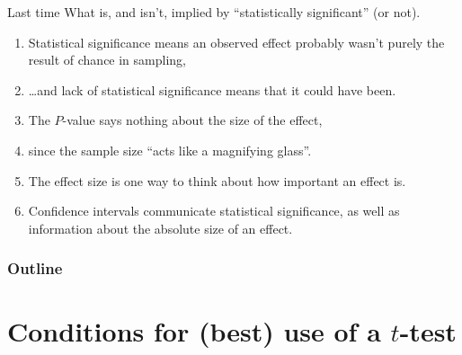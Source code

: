 

\subtitle{and checking conditions}

\date{24 October 2013}




\begin{frame}
  \maketitle
\end{frame}


\begin{frame}{Last time}
  What is, and isn't, implied by ``statistically significant'' (or not).
  \begin{enumerate}
    \item Statistical significance means an observed effect probably wasn't purely the result of chance in sampling,
    \item   \ldots and lack of statistical significance means that it could have been.
    \item The $P$-value says nothing about the size of the effect,
    \item   since the sample size ``acts like a magnifying glass''.
    \item The \alert{effect size} is one way to think about how important an effect is.
    \item Confidence intervals communicate statistical significance,
      as well as information about the absolute size of an effect.
  \end{enumerate}
\end{frame}

\begin{frame}\frametitle<presentation>{Outline}
  \tableofcontents
\end{frame}


\section{Conditions for (best) use of a $t$-test}

